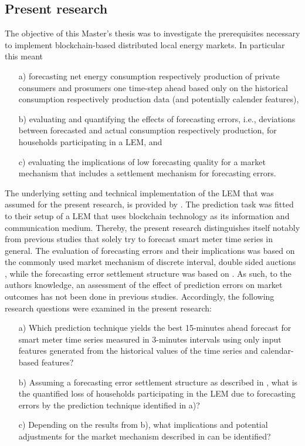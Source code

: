 \subsection{Present research}\label{Sec:Intro;Subsec:Present}

The objective of this Master's thesis was to investigate the prerequisites necessary to implement blockchain-based distributed local energy markets. In particular this meant
\begin{itemize}
    \item[a)] forecasting net energy consumption respectively production of private consumers and prosumers one time-step ahead based only on the historical consumption respectively production data (and potentially calender features),
    \item[b)] evaluating and quantifying the effects of forecasting errors, i.e., deviations between forecasted and actual consumption respectively production, for households participating in a LEM, and
    \item[c)] evaluating the implications of low forecasting quality for a market mechanism that includes a settlement mechanism for forecasting errors.
\end{itemize}

The underlying setting and technical implementation of the LEM that was assumed for the present research, is provided by \citet{Mengelkamp:2018a}. The prediction task was fitted to their setup of a LEM that uses blockchain technology as its information and communication medium. Thereby, the present research distinguishes itself notably from previous studies that solely try to forecast smart meter time series in general. The evaluation of forecasting errors and their implications was based on the commonly used market mechanism of discrete interval, double sided auctions \citep[e.g.,][]{Block:2008, Buchmann:2013}, while the forecasting error settlement structure was based on \citep{Mengelkamp:2018a}. As such, to the authors knowledge, an assessment of the effect of prediction errors on market outcomes has not been done in previous studies. Accordingly, the following research questions were examined in the present research:
\begin{itemize}
    \item[a)] Which prediction technique yields the best 15-minutes ahead forecast  for smart meter time series measured in 3-minutes intervals using only input features generated from the historical values of the time series and calendar-based features?
    \item[b)] Assuming a forecasting error settlement structure as described in \citet{Mengelkamp:2018a}, what is the quantified loss of households participating in the LEM due to forecasting errors by the prediction technique identified in a)?
    \item[c)] Depending on the results from b), what implications and potential adjustments for the market mechanism described in \citet{Mengelkamp:2018a} can be identified?
\end{itemize}

